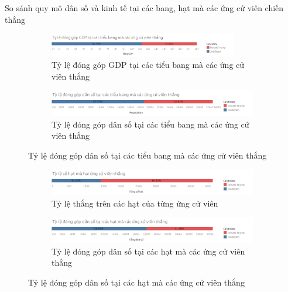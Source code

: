 \documentclass[10pt]{beamer}
\theoremstyle{remark}
\theoremstyle{definition}
\begin{document}
\begin{frame}{So sánh quy mô dân số và kinh tế tại các bang, hạt mà các ứng cử viên chiến thắng}
	\begin{figure}[h!]
        \centering
        \begin{subfigure}[b]{\textwidth}
            \includegraphics[width=0.9\textwidth]{State_Percentage_GDP_Candidate.png}
            \caption{Tỷ lệ đóng góp GDP tại các tiểu bang mà các ứng cử viên thắng}
        \end{subfigure}
        \vfill
        \begin{subfigure}[b]{\linewidth}
            \includegraphics[width=0.9\linewidth]{State_Percentage_Population_Candidate.png}
            \caption{Tỷ lệ đóng góp dân số tại các tiểu bang mà các ứng cử viên thắng}
        \end{subfigure}
    \end{figure}
	
\end{frame}

\begin{frame}
	\begin{figure}[h!]
        \begin{subfigure}[b]{\textwidth}
            \includegraphics[width=0.9\linewidth]{County_Total_Percentage_Candidate_Win.png}
            \caption{Tỷ lệ thắng trên các hạt của từng ứng cử viên}
        \end{subfigure}
        \vfill
        \begin{subfigure}[b]{\textwidth}
            \includegraphics[width=0.9\linewidth]{County_Percentage_Population_Candidate.png}
            \caption{Tỷ lệ đóng góp dân số tại các hạt mà các ứng cử viên thắng}
        \end{subfigure}
    \end{figure}
\end{frame}
\end{document}
